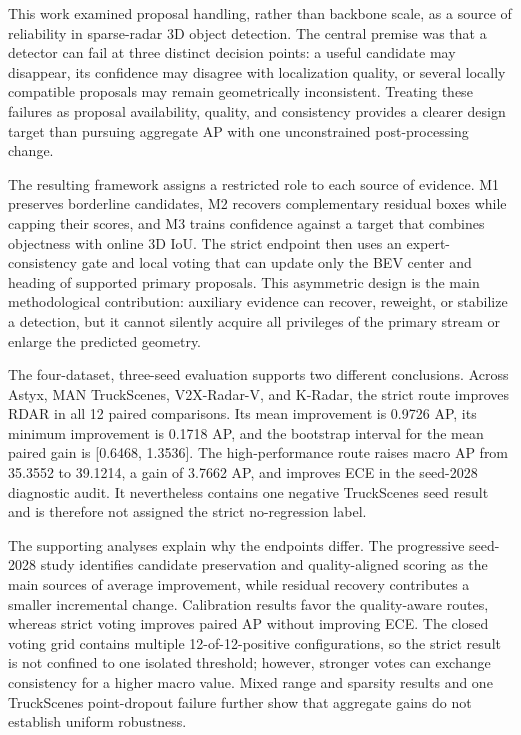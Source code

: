 \documentclass[final,5p,times]{elsarticle}
\begin{document}
This work examined proposal handling, rather than backbone scale, as a source
of reliability in sparse-radar 3D object detection. The central premise was
that a detector can fail at three distinct decision points: a useful candidate
may disappear, its confidence may disagree with localization quality, or
several locally compatible proposals may remain geometrically inconsistent.
Treating these failures as proposal availability, quality, and consistency
provides a clearer design target than pursuing aggregate AP with one
unconstrained post-processing change.

The resulting framework assigns a restricted role to each source of evidence.
M1 preserves borderline candidates, M2 recovers complementary residual boxes
while capping their scores, and M3 trains confidence against a target that
combines objectness with online 3D IoU. The strict endpoint then uses an
expert-consistency gate and local voting that can update only the BEV center
and heading of supported primary proposals. This asymmetric design is the main
methodological contribution: auxiliary evidence can recover, reweight, or
stabilize a detection, but it cannot silently acquire all privileges of the
primary stream or enlarge the predicted geometry.

The four-dataset, three-seed evaluation supports two different conclusions.
Across Astyx, MAN TruckScenes, V2X-Radar-V, and K-Radar, the strict route
improves RDAR in all 12 paired comparisons. Its mean improvement is 0.9726 AP,
its minimum improvement is 0.1718 AP, and the bootstrap interval for the mean
paired gain is [0.6468, 1.3536]. The high-performance route raises macro AP
from 35.3552 to 39.1214, a gain of 3.7662 AP, and improves ECE in the
seed-2028 diagnostic audit. It nevertheless contains one negative
TruckScenes seed result and is therefore not assigned the strict
no-regression label.

The supporting analyses explain why the endpoints differ. The progressive
seed-2028 study identifies candidate preservation and quality-aligned scoring
as the main sources of average improvement, while residual recovery contributes
a smaller incremental change. Calibration results favor the quality-aware
routes, whereas strict voting improves paired AP without improving ECE. The
closed voting grid contains multiple 12-of-12-positive configurations, so the
strict result is not confined to one isolated threshold; however, stronger
votes can exchange consistency for a higher macro value. Mixed range and
sparsity results and one TruckScenes point-dropout failure further show that
aggregate gains do not establish uniform robustness.
\end{document}
